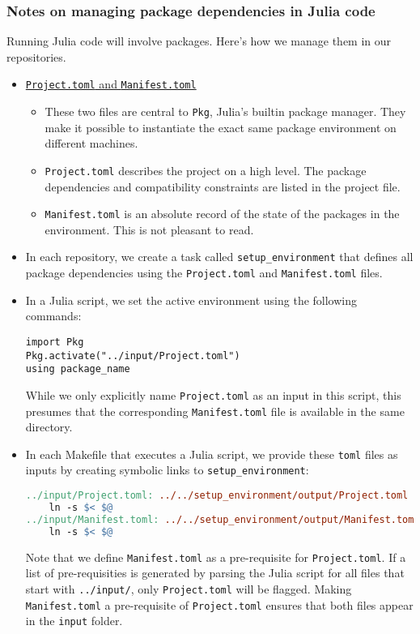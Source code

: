 \subsubsection{Notes on managing package dependencies in Julia code}
Running Julia code will involve packages.
Here's how we manage them in our repositories.
\begin{itemize}
\item \href{https://julialang.github.io/Pkg.jl/v1/toml-files/}{\texttt{Project.toml} and \texttt{Manifest.toml}}
\begin{itemize}
	\item These two files are central to \texttt{Pkg}, Julia's builtin package manager.
	They make it possible to instantiate the exact same package environment on different machines.
	\item \texttt{Project.toml} describes the project on a high level. The package dependencies and compatibility constraints are listed in the project file.
	\item \texttt{Manifest.toml} is an absolute record of the state of the packages in the environment. This is not pleasant to read.
\end{itemize}
\item In each repository, we create a task called \texttt{setup\_environment} that defines all package dependencies using the \texttt{Project.toml} and \texttt{Manifest.toml} files.
\item In a Julia script, we set the active environment using the following commands:
\begin{lstlisting}
import Pkg
Pkg.activate("../input/Project.toml")
using package_name
\end{lstlisting}
While we only explicitly name \texttt{Project.toml} as an input in this script,
this presumes that the corresponding \texttt{Manifest.toml} file is available in the same directory.
\item In each Makefile that executes a Julia script,
we provide these \texttt{toml} files as inputs by creating symbolic links to \texttt{setup\_environment}:
\begin{lstlisting}[language=make]
../input/Project.toml: ../../setup_environment/output/Project.toml | ../input/Manifest.toml ../input
	ln -s $< $@
../input/Manifest.toml: ../../setup_environment/output/Manifest.toml | ../input
	ln -s $< $@
\end{lstlisting}
Note that we define \texttt{Manifest.toml} as a pre-requisite for \texttt{Project.toml}.
If a list of pre-requisities is generated by parsing the Julia script for all files that start with \texttt{../input/},
only \texttt{Project.toml} will be flagged.
Making \texttt{Manifest.toml} a pre-requisite of \texttt{Project.toml} ensures that both files appear in the \texttt{input} folder.
\end{itemize}
